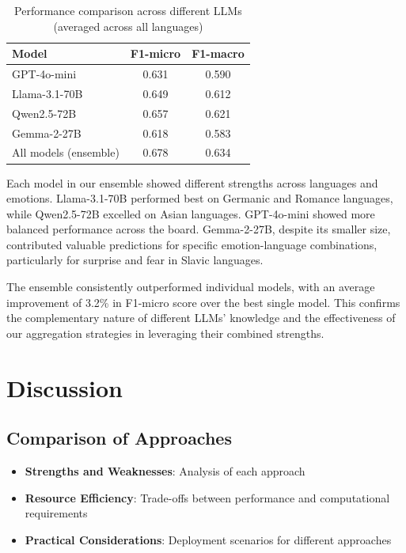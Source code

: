 \documentclass[a4paper,12pt]{extarticle}
\begin{document}
\begin{table}[h]
\centering
\begin{tabular}{lcc}
\toprule
\textbf{Model} & \textbf{F1-micro} & \textbf{F1-macro} \\
\midrule
GPT-4o-mini & 0.631 & 0.590 \\
Llama-3.1-70B & 0.649 & 0.612 \\
Qwen2.5-72B & 0.657 & 0.621 \\
Gemma-2-27B & 0.618 & 0.583 \\
All models (ensemble) & 0.678 & 0.634 \\
\bottomrule
\end{tabular}
\caption{Performance comparison across different LLMs (averaged across all languages)}
\label{tab:cross_model}
\end{table}

Each model in our ensemble showed different strengths across languages and emotions. Llama-3.1-70B performed best on Germanic and Romance languages, while Qwen2.5-72B excelled on Asian languages. GPT-4o-mini showed more balanced performance across the board. Gemma-2-27B, despite its smaller size, contributed valuable predictions for specific emotion-language combinations, particularly for surprise and fear in Slavic languages.

The ensemble consistently outperformed individual models, with an average improvement of 3.2\% in F1-micro score over the best single model. This confirms the complementary nature of different LLMs' knowledge and the effectiveness of our aggregation strategies in leveraging their combined strengths.

\section{Discussion}

\subsection{Comparison of Approaches}
\begin{itemize}
\item \textbf{Strengths and Weaknesses}: Analysis of each approach
\item \textbf{Resource Efficiency}: Trade-offs between performance and computational requirements
\item \textbf{Practical Considerations}: Deployment scenarios for different approaches
\end{itemize}
\end{document}
